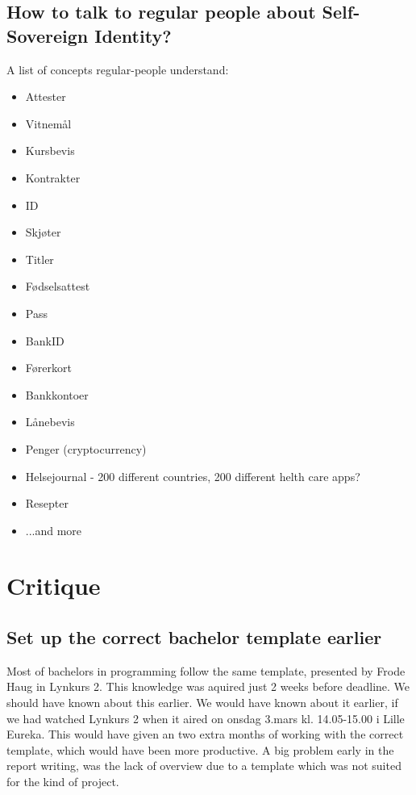 \newpage

\subsection{How to talk to regular people about Self-Sovereign Identity?}

A list of concepts regular-people understand:
\begin{itemize}
    \item Attester
    \item Vitnemål
    \item Kursbevis
    \item Kontrakter
    \item ID
    \item Skjøter
    \item Titler
    \item Fødselsattest
    \item Pass
    \item BankID
    \item Førerkort
    \item Bankkontoer
    \item Lånebevis
    \item Penger (cryptocurrency)
    \item Helsejournal - 200 different countries, 200 different helth care apps?
    \item Resepter
    \item ...and more
\end{itemize}





\section{Critique}

\subsection{Set up the correct bachelor template earlier}

Most of bachelors in programming follow the same template, presented by Frode Haug in Lynkurs 2. This knowledge was aquired just 2 weeks before deadline. We should have known about this earlier. We would have known about it earlier, if we had watched Lynkurs 2 when it aired on onsdag 3.mars kl. 14.05-15.00 i Lille Eureka. This would have given an two extra months of working with the correct template, which would have been more productive. A big problem early in the report writing, was the lack of overview due to a template which was not suited for the kind of project.



